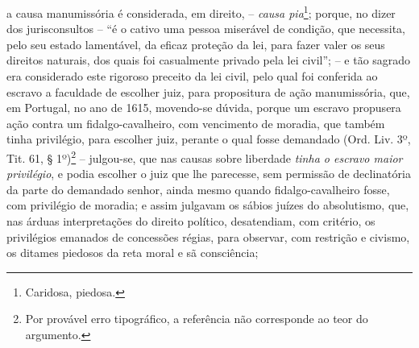 a causa manumissória é considerada, em direito, -- \emph{causa
pia}\footnote{Caridosa, piedosa.}; porque, no dizer dos jurisconsultos
-- ``é o cativo uma pessoa miserável de condição, que necessita, pelo
seu estado lamentável, da eficaz proteção da lei, para fazer valer os
seus direitos naturais, dos quais foi casualmente privado pela lei
civil''; -- e tão sagrado era considerado este rigoroso preceito da lei
civil, pelo qual foi conferida ao escravo a faculdade de escolher juiz,
para propositura de ação manumissória, que, em Portugal, no ano de 1615,
movendo-se dúvida, porque um escravo propusera ação contra um
fidalgo-cavalheiro, com vencimento de moradia, que também tinha
privilégio, para escolher juiz, perante o qual fosse demandado (Ord.
Liv. 3º, Tit. 61, § 1º)\footnote{Por provável erro tipográfico, a
  referência não corresponde ao teor do argumento.} -- julgou-se, que
nas causas sobre liberdade \emph{tinha o escravo maior privilégio}, e
podia escolher o juiz que lhe parecesse, sem permissão de declinatória
da parte do demandado senhor, ainda mesmo quando fidalgo-cavalheiro
fosse, com privilégio de moradia; e assim julgavam os sábios juízes do
absolutismo, que, nas árduas interpretações do direito político,
desatendiam, com critério, os privilégios emanados de concessões régias,
para observar, com restrição e civismo, os ditames piedosos da reta
moral e sã consciência;

